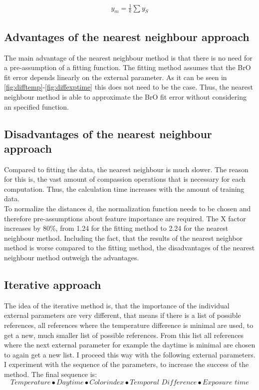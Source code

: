 \documentclass  [
  paper    = a4,
  BCOR     = 10mm,
  twoside,
  fontsize = 12pt,
  fleqn,
  toc      = bibnumbered,
  toc      = listofnumbered,
  numbers  = noendperiod,
  headings = normal,
  listof   = leveldown,
  version  = 3.03
]                                       {scrreprt}
\begin{document}
%

\begin{align}
y_m = \frac{1}{k} \sum y_S \label{eq:knn_regression}
\end{align}

%

\subsection*{Advantages of the nearest neighbour approach}
	The main advantage of the nearest neighbour method is that there is no need for a pre-assumption of a fitting function. The fitting method assumes that the BrO fit error depends linearly  on the external parameter. As it can be seen in \cref{fig:difftemp}-\cref{fig:diffexptime} this does not need to be the case. Thus, the nearest neighbour method is able to approximate the BrO fit error without considering an specified function.
%
\subsection*{Disadvantages of the nearest neighbour approach}
	Compared to fitting the data, the nearest neighbour is much slower. The reason for this is, the vast amount of compassion operations that is necessary for each computation. Thus, the calculation time increases with the amount of training data.\\
	To normalize the distances d, the normalization function needs to be chosen and therefore pre-assumptions about feature importance are required.
	The X factor increases by 80\%, from 1.24 for the fitting method 
	to 2.24 for the nearest neighbour method.
	Including the fact, that the results of the nearest neighbor method is worse compared to the fitting method, the disadvantages of the nearest neighbour method outweigh the advantages.

	\subsection{Iterative approach}

	The idea of the iterative method is, that the importance of the individual external parameters are very different, that means if there is a list of possible references, all references where the temperature difference is minimal are used, to get a new, much smaller list of possible references. From this list all references where the next external parameter for example the daytime is minimal are chosen to again get a new list. I proceed this way with the following external parameters. I experiment with the sequence of the parameters, to increase the success of the method. The final sequence is:
	\begin{equation*}
	Temperature \bullet  Daytime  \bullet Colorindex \bullet Temporal\,\, Difference \bullet Exposure \,\, time
	\end{equation*} 
\end{document}
